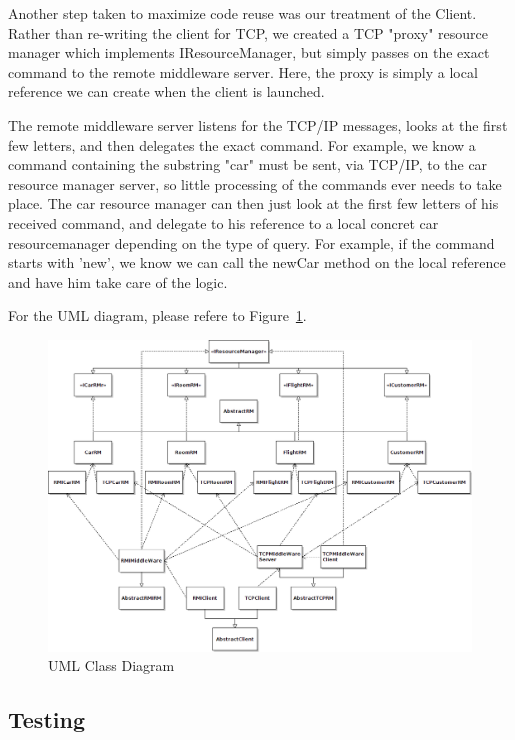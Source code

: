 \documentclass[a4paper]{article}
\begin{document}
Another step taken to maximize code reuse was our treatment of the Client. Rather than re-writing the client for TCP, we created a TCP "proxy" resource
manager which implements IResourceManager, but simply passes on the exact command to the remote middleware server. Here, the proxy is simply a local
reference we can create when the client is launched.


The remote middleware server listens for the TCP/IP messages, looks at the first few letters, and 
then delegates the exact command. For example, we know a command containing the substring "car" must be sent, via TCP/IP, to the car resource manager server,
so little processing of the commands ever needs to take place. The car resource manager can then just look at the first few letters of his received command,
and delegate to his reference to a local concret car resourcemanager depending on the type of query. For example, if the command starts with 'new', we know
we can call the newCar method on the local reference and have him take care of the logic. 


For the UML diagram, please refere to Figure~\ref{uml}.

\begin{figure}
  \centering
	\includegraphics[scale=0.6,angle=90]{classhierarchy.png}
  \caption{UML Class Diagram}
  \label{uml}
\end{figure}


\subsection{Testing}
\end{document}
